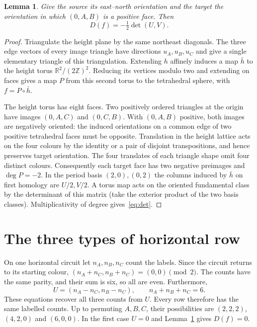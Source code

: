 \documentclass[11pt,a4paper]{article}
\newtheorem{lemma}[theorem]{Lemma}
\newcommand{\Z}{\mathbb Z}
\newcommand{\R}{\mathbb R}
\begin{document}
\begin{lemma}\label{lem:det}
Give the source its east--north orientation and the target the orientation in which $(0,A,B)$ is a positive face. Then
\begin{equation}\label{eq:det}
 D(f)=-\tfrac12\det(U,V).
\end{equation}
\end{lemma}
\begin{proof}
Triangulate the height plane by the same northeast diagonals. The three edge vectors of every image triangle have directions $u_A,u_B,u_C$ and give a single elementary triangle of this triangulation. Extending $h$ affinely induces a map $\bar h$ to the height torus $\R^2/(2\Z)^2$. Reducing its vertices modulo two and extending on faces gives a map $P$ from this second torus to the tetrahedral sphere, with $f=P\circ\bar h$.

The height torus has eight faces. Two positively ordered triangles at the origin have images $(0,A,C)$ and $(0,C,B)$. With $(0,A,B)$ positive, both images are negatively oriented: the induced orientations on a common edge of two positive tetrahedral faces must be opposite. Translation in the height lattice acts on the four colours by the identity or a pair of disjoint transpositions, and hence preserves target orientation. The four translates of each triangle shape omit four distinct colours. Consequently each target face has two negative preimages and $\deg P=-2$. In the period basis $(2,0),(0,2)$ the columns induced by $\bar h$ on first homology are $U/2,V/2$. A torus map acts on the oriented fundamental class by the determinant of this matrix (take the exterior product of the two basis classes). Multiplicativity of degree gives~\eqref{eq:det}.
\end{proof}

\section{The three types of horizontal row}

On one horizontal circuit let $n_A,n_B,n_C$ count the labels. Since the circuit returns to its starting colour, $(n_A+n_C,n_B+n_C)=(0,0)\pmod2$. The counts have the same parity, and their sum is six, so all are even. Furthermore,
\[
 U=(n_A-n_C,n_B-n_C),\qquad n_A+n_B+n_C=6.
\]
These equations recover all three counts from $U$. Every row therefore has the same labelled counts. Up to permuting $A,B,C$, their possibilities are $(2,2,2)$, $(4,2,0)$ and $(6,0,0)$. In the first case $U=0$ and Lemma~\ref{lem:det} gives $D(f)=0$.
\end{document}
